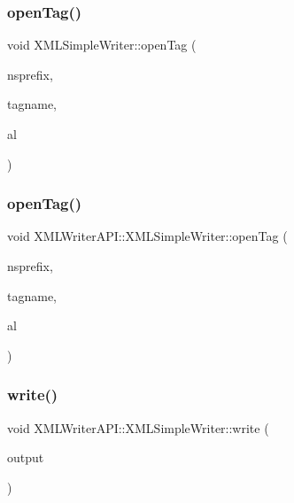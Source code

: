 \subsubsection{\texorpdfstring{openTag()}{openTag()}\hspace{0.1cm}{\footnotesize\ttfamily [7/8]}}
{\footnotesize\ttfamily void X\+M\+L\+Simple\+Writer\+::open\+Tag (\begin{DoxyParamCaption}\item[{const std\+::string \&}]{nsprefix,  }\item[{const std\+::string \&}]{tagname,  }\item[{\mbox{\hyperlink{namespaceXMLWriterAPI_a28cf3d8051a4ccf0aef208b7ebc66d07}{Attribute\+List}} \&}]{al }\end{DoxyParamCaption})}

\mbox{\label{classXMLWriterAPI_1_1XMLSimpleWriter_a4c32b9b8afe37e1ea1b0723d5248f140}} 
\subsubsection{\texorpdfstring{openTag()}{openTag()}\hspace{0.1cm}{\footnotesize\ttfamily [8/8]}}
{\footnotesize\ttfamily void X\+M\+L\+Writer\+A\+P\+I\+::\+X\+M\+L\+Simple\+Writer\+::open\+Tag (\begin{DoxyParamCaption}\item[{const std\+::string \&}]{nsprefix,  }\item[{const std\+::string \&}]{tagname,  }\item[{\mbox{\hyperlink{namespaceXMLWriterAPI_a28cf3d8051a4ccf0aef208b7ebc66d07}{Attribute\+List}} \&}]{al }\end{DoxyParamCaption})}

\mbox{\label{classXMLWriterAPI_1_1XMLSimpleWriter_a1c5de7aca63e28a5e02a3f054a2b2a75}} 
\subsubsection{\texorpdfstring{write()}{write()}\hspace{0.1cm}{\footnotesize\ttfamily [1/20]}}
{\footnotesize\ttfamily void X\+M\+L\+Writer\+A\+P\+I\+::\+X\+M\+L\+Simple\+Writer\+::write (\begin{DoxyParamCaption}\item[{const std\+::string \&}]{output }\end{DoxyParamCaption})}

